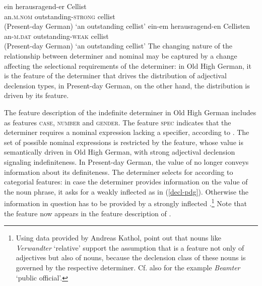 \documentclass[output=paper
                ,modfonts
                ,nonflat
	        ,collection
	        ,collectionchapter
	        ,collectiontoclongg
 	        ,biblatex
                ,babelshorthands
                ,newtxmath
                ,draftmode
                ,colorlinks, citecolor=brown
]{./langsci/langscibook}
\begin{document}
\eal
\ex 
\gll ein herausragend-er Cellist  \\ an.\textsc{m.nom} outstanding-\textsc{strong} cellist\\  \hfill (Present-day German)
\glt `an outstanding cellist'
\ex
\gll ein-em herausragend-en Cellisten \\ an-\textsc{m.dat} outstanding-\textsc{weak} {cellist}\\ \hfill (Present-day German)
\glt `an outstanding cellist'
\zl
The changing nature of the relationship between determiner and nominal may be captured by a change affecting the selectional requirements of the determiner: in Old High German, it is the \content feature of the determiner that drives the distribution of adjectival declension types, in Present-day German, on the other hand, the distribution is driven by its \cat feature. 

The feature description of the indefinite determiner in Old High German includes as \AGR {} features \textsc{case}, \textsc{number} and \textsc{gender}. The feature \textsc{spec} indicates that the determiner requires a nominal expression lacking a specifier, \ie \nom {} according to \cite[64]{SaWaBe2003}. The set of possible nominal expressions is restricted by the \decl feature, whose value is semantically driven in Old High German, with strong adjectival declension signaling indefiniteness.  
\ea 
{}
\z  
In Present-day German, the \decl value of \nom {} no longer conveys information about its definiteness. The determiner selects for \nom according to categorial features: in case the determiner provides information on the \AGR {} value of the noun phrase, it asks for a weakly inflected \nom {} as in (\ref{decl-pdg}). Otherwise the information in question has to be provided by a strongly inflected \nom.\footnote{Using data provided by Andreas Kathol, \cite[373]{PoSa94} point out that nouns like \textit{Verwandter} `relative' support the assumption that \decl {} is a feature not only of adjectives but also of nouns, because the declension class of these nouns is governed by the respective determiner. Cf. also \cite[64]{kiss1995} for the example \textit{Beamter} `public official'.} Note that the \decl feature now appears in the feature description of \cat \citep[65]{kiss1995}.
\ea \label{decl-pdg}
\z 
\end{document}

